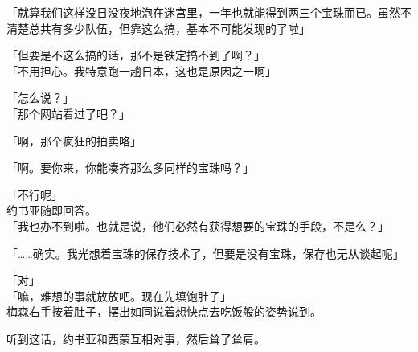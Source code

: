 「就算我们这样没日没夜地泡在迷宫里，一年也就能得到两三个宝珠而已。虽然不清楚总共有多少队伍，但靠这么搞，基本不可能发现的了啦」

「但要是不这么搞的话，那不是铁定搞不到了啊？」\\

「不用担心。我特意跑一趟日本，这也是原因之一啊」

「怎么说？」\\

「那个网站看过了吧？」

「啊，那个疯狂的拍卖咯」

「啊。要你来，你能凑齐那么多同样的宝珠吗？」

「不行呢」\\

约书亚随即回答。\\

「我也办不到啦。也就是说，他们必然有获得想要的宝珠的手段，不是么？」

「……确实。我光想着宝珠的保存技术了，但要是没有宝珠，保存也无从谈起呢」

「对」\\

「嘛，难想的事就放放吧。现在先填饱肚子」\\

梅森右手按着肚子，摆出如同说着想快点去吃饭般的姿势说到。

听到这话，约书亚和西蒙互相对事，然后耸了耸肩。\\

